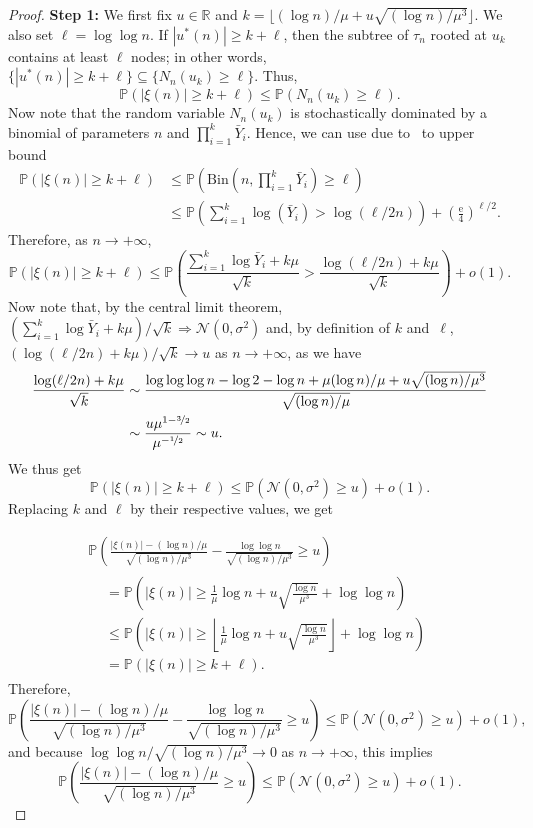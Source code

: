 \documentclass[AHL,Unicode,longabstracts,published]{cedram}
\newcommand{\bbP}{\mathbb{P}}
\newcommand{\bbR}{\mathbb{R}}
\newcommand{\clN}{\mathcal{N}}
\newcommand{\Bin}{\mathrm{Bin}}
\newcommand{\rme}{\mathrm{e}}
\begin{document}
\begin{proof}
{\bf Step 1:} We first fix $u\in\bbR$ and $k = \lfloor (\log n)/\mu + u\sqrt{(\log n)/\mu^3}\rfloor$. We also set $\ell = \log\log n$. If $|u^*(n)|\geq k+\ell$, then the subtree of $\tau_n$ rooted at $u_k$ contains at least $\ell$ nodes; in other words, $\{|u^*(n)|\geq k+\ell\}\subseteq \{N_n(u_k) \geq \ell\}$. Thus,
\[
\bbP(|\xi(n)|\geq k+\ell)
\leq \bbP(N_n(u_k)\geq \ell).
\]
Now note that the random variable $N_n(u_k)$ is stochastically dominated by a binomial of parameters $n$ and $\prod_{i=1}^k \bar Y_i.$ Hence, we can use due to~\cite[Lemma~4]{devroye-split} to upper bound
\begin{align*}
\bbP(|\xi(n)|\geq k+\ell)
&\leq \bbP\left(\Bin\left(n, \prod_{i=1}^k \bar Y_i\right)\geq \ell\right)\\
&\leq \bbP\left(\sum_{i=1}^k \log(\bar Y_i) > \log(\ell/2n)\right)+\left(\frac{\rme}4\right)^{\ell/2}.
\end{align*}
Therefore, as $n\to+\infty$,
\[
\bbP(|\xi(n)|\geq k+\ell)
\leq \bbP\left(\frac{\sum_{i=1}^k \log \bar Y_i +k\mu}{\sqrt k} > \frac{\log(\ell/2n)+k\mu}{\sqrt k}\right)+o(1).
\]
Now note that, by the central limit theorem, $(\sum_{i=1}^k \log \bar Y_i +k\mu)/\sqrt k \Rightarrow \clN(0,\sigma^2)$ and, by definition of $k$ and~$\ell$, $(\log(\ell/2n)+k\mu)/\sqrt k \to u$ as $n\to+\infty$, as we have
\begin{align*}
\frac{\log(\ell/2n)+k\mu}{\sqrt k} &\sim \frac{\log\log\log n - \log 2- \log n + \mu(\log n)/\mu+u\sqrt{(\log n)/\mu^3}}{\sqrt{(\log n)/\mu}}\\
&\sim \frac{u\mu^{1-\nicefrac32}}{\mu^{-\nicefrac12}} \sim u.
\end{align*}
We thus get
\[
\bbP(|\xi(n)|\geq k+\ell)\leq \bbP(\clN(0,\sigma^2)\geq u)+o(1).
\]
Replacing $k$ and $\ell$ by their respective values, we get

\begin{multline*}
\bbP\left(\frac{|\xi(n)|-(\log n)/\mu}{\sqrt{(\log n)/\mu^3}}-\frac{\log \log n}{\sqrt{(\log n)/\mu^3}}\geq u\right)\\
\begin{aligned}
&= \bbP\left(|\xi(n)| \geq \frac1\mu\log n + u\sqrt{\frac{\log n}{\mu^3}} + \log\log n\right)\\
&\leq \bbP\left(|\xi(n)| \geq \left\lfloor\frac1\mu\log n + u\sqrt{\frac{\log n}{\mu^3}}\right\rfloor+\log\log n\right)\\
&= \bbP(|\xi(n)|\geq k+\ell).
\end{aligned}
\end{multline*}
Therefore,
\[
\bbP\left(\frac{|\xi(n)|-(\log n)/\mu}{\sqrt{(\log n)/\mu^3}}-\frac{\log \log n}{\sqrt{(\log n)/\mu^3}}\geq u\right)
\leq \bbP(\clN(0,\sigma^2)\geq u)+o(1),
\]
and because $\log\log n/\sqrt{(\log n)/\mu^3}\to 0$ as $n\to+\infty$, this implies
\begin{equation}\label{eq:1st_bound_Dn}
\bbP\left(\frac{|\xi(n)|-(\log n)/\mu}{\sqrt{(\log n)/\mu^3}}\geq u\right)
\leq \bbP(\clN(0,\sigma^2)\geq u)+o(1).
\end{equation}


\end{proof}
\end{document}
